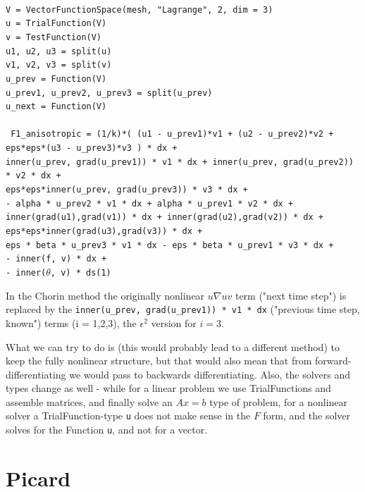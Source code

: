 \documentclass[11pt]{article}
\begin{document}
\texttt{
\\
V = VectorFunctionSpace(mesh, "Lagrange", 2, dim = 3)\\
u = TrialFunction(V)\\
v = TestFunction(V)\\
u1, u2, u3 = split(u)\\
v1, v2, v3 = split(v)\\
u\_prev = Function(V)\\
u\_prev1, u\_prev2, u\_prev3 = split(u\_prev)\\
u\_next = Function(V)\\
\\
}
\texttt{
F1\_anisotropic = (1/k)*( (u1 - u\_prev1)*v1 + (u2 - u\_prev2)*v2 + eps*eps*(\textcolor{terracotta}{u3} - u\_prev3)*v3 ) * dx + \\
        inner(u\_prev, grad(u\_prev1)) * v1 * dx + inner(u\_prev, grad(u\_prev2)) * v2 * dx + \\
        eps*eps*inner(u\_prev, grad(u\_prev3)) * v3 * dx + \\
        - alpha * u\_prev2 * v1 * dx + alpha * u\_prev1 * v2 * dx + \\
        inner(grad(u1),grad(v1)) * dx + inner(grad(u2),grad(v2)) * dx + eps*eps*inner(grad(\textcolor{terracotta}{u3}),grad(v3)) * dx + \\
        eps * beta * u\_prev3 * v1 * dx - eps * beta * u\_prev1 * v3 * dx + \\
        - inner(f, v) * dx + \\
        - inner($\theta$, v) * ds(1)\\
}

In the Chorin method the originally nonlinear $u \nabla u v$ term ("next time step") is replaced by the \texttt{inner(u\_prev, grad(u\_prev1)) * v1 * dx} ("previous time step, known") terms (i = 1,2,3), the $\epsilon^2$ version for $i=3.$

What we can try to do is (this would probably lead to a different method) to keep the fully nonlinear structure, but that would also mean that from forward-differentiating we would pass to backwards differentiating. Also, the solvers and types change as well - while for a linear problem we use TrialFunctions and assemble matrices, and finally solve an $A x = b$ type of problem, for a nonlinear solver a TrialFunction-type \texttt{u} does not make sense in the $F$ form, and the solver solves for the Function \texttt{u}, and not for a vector.

\section{Picard}
\end{document}

